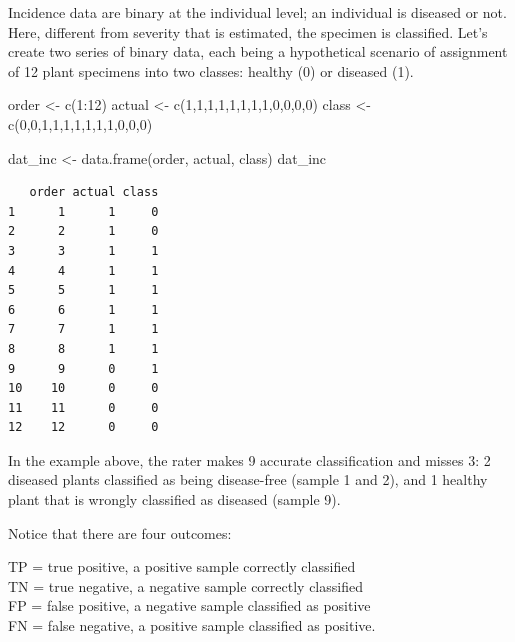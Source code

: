 \documentclass[
  letterpaper,
]{book}
\newenvironment{Shaded}{\begin{snugshade}}{\end{snugshade}}
\newcommand{\DecValTok}[1]{\textcolor[rgb]{0.68,0.00,0.00}{#1}}
\newcommand{\FunctionTok}[1]{\textcolor[rgb]{0.28,0.35,0.67}{#1}}
\newcommand{\NormalTok}[1]{\textcolor[rgb]{0.00,0.23,0.31}{#1}}
\newcommand{\OtherTok}[1]{\textcolor[rgb]{0.00,0.23,0.31}{#1}}
\newcommand{\SpecialCharTok}[1]{\textcolor[rgb]{0.37,0.37,0.37}{#1}}
\begin{document}
Incidence data are binary at the individual level; an individual is
diseased or not. Here, different from severity that is estimated, the
specimen is classified. Let's create two series of binary data, each
being a hypothetical scenario of assignment of 12 plant specimens into
two classes: healthy (0) or diseased (1).

\begin{Shaded}
\begin{Highlighting}[]
\NormalTok{order }\OtherTok{\textless{}{-}} \FunctionTok{c}\NormalTok{(}\DecValTok{1}\SpecialCharTok{:}\DecValTok{12}\NormalTok{)}
\NormalTok{actual }\OtherTok{\textless{}{-}} \FunctionTok{c}\NormalTok{(}\DecValTok{1}\NormalTok{,}\DecValTok{1}\NormalTok{,}\DecValTok{1}\NormalTok{,}\DecValTok{1}\NormalTok{,}\DecValTok{1}\NormalTok{,}\DecValTok{1}\NormalTok{,}\DecValTok{1}\NormalTok{,}\DecValTok{1}\NormalTok{,}\DecValTok{0}\NormalTok{,}\DecValTok{0}\NormalTok{,}\DecValTok{0}\NormalTok{,}\DecValTok{0}\NormalTok{)}
\NormalTok{class }\OtherTok{\textless{}{-}} \FunctionTok{c}\NormalTok{(}\DecValTok{0}\NormalTok{,}\DecValTok{0}\NormalTok{,}\DecValTok{1}\NormalTok{,}\DecValTok{1}\NormalTok{,}\DecValTok{1}\NormalTok{,}\DecValTok{1}\NormalTok{,}\DecValTok{1}\NormalTok{,}\DecValTok{1}\NormalTok{,}\DecValTok{1}\NormalTok{,}\DecValTok{0}\NormalTok{,}\DecValTok{0}\NormalTok{,}\DecValTok{0}\NormalTok{)}

\NormalTok{dat\_inc }\OtherTok{\textless{}{-}} \FunctionTok{data.frame}\NormalTok{(order, actual, class)}
\NormalTok{dat\_inc }
\end{Highlighting}
\end{Shaded}

\begin{verbatim}
   order actual class
1      1      1     0
2      2      1     0
3      3      1     1
4      4      1     1
5      5      1     1
6      6      1     1
7      7      1     1
8      8      1     1
9      9      0     1
10    10      0     0
11    11      0     0
12    12      0     0
\end{verbatim}

In the example above, the rater makes 9 accurate classification and
misses 3: 2 diseased plants classified as being disease-free (sample 1
and 2), and 1 healthy plant that is wrongly classified as diseased
(sample 9).

Notice that there are four outcomes:

TP = true positive, a positive sample correctly classified\\
TN = true negative, a negative sample correctly classified\\
FP = false positive, a negative sample classified as positive\\
FN = false negative, a positive sample classified as positive.
\end{document}
